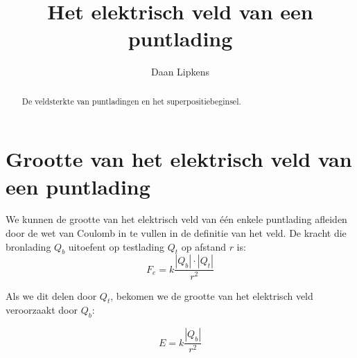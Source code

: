 \documentclass{ximera}
\title{Het elektrisch veld van een puntlading}
\author{Daan Lipkens}
\begin{document}
\begin{abstract}
    De veldsterkte van puntladingen en het superpositiebeginsel.
\end{abstract}
\maketitle



\section{Grootte van het elektrisch veld van een puntlading}

We kunnen de grootte van het elektrisch veld van één enkele puntlading afleiden door de wet van Coulomb in te vullen in de definitie van het veld. De kracht die bronlading $Q_b$ uitoefent op testlading $Q_t$ op afstand $r$ is:
$$ F_e = k \frac{|Q_b| \cdot |Q_t|}{r^2} $$

Als we dit delen door $Q_t$, bekomen we de grootte van het elektrisch veld veroorzaakt door $Q_b$:

\begin{definition}[title={Formule radiaal veld}]\nl
    $$E = k \frac{|Q_b|}{r^2}$$
\end{definition}
\end{document}
